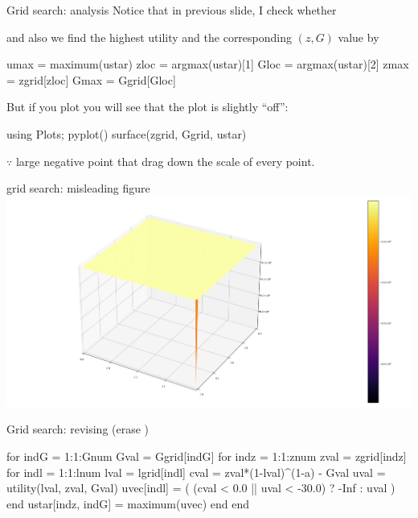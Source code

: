 \documentclass[11pt,aspectratio=43,usenames,dvipsnames]{beamer}
\theoremstyle{definition}
\begin{document}
\begin{frame}[fragile]{Grid search: analysis}
\label{slide:Grid_search__analysis}
Notice that in previous slide, I check whether 

and also we find the highest utility and the corresponding $ (z, G) $ value by
\begin{juliacode}
    umax = maximum(ustar)
    zloc = argmax(ustar)[1]
    Gloc = argmax(ustar)[2]
    zmax = zgrid[zloc]
    Gmax = Ggrid[Gloc]
\end{juliacode}

But if you plot you will see that the plot is slightly ``off'':
\begin{juliacode}
    using Plots; pyplot()
    surface(zgrid, Ggrid, ustar)
\end{juliacode}

$ \because $ large negative point that drag down the scale of every point.

\end{frame}

\begin{frame}{grid search: misleading figure}
\label{slide:grid_search__misleading_figure}
    \includegraphics[width=\textwidth]{./figures/utilitygov_wrong.png}
\end{frame}

\begin{frame}[fragile]{Grid search: revising (erase )}
\label{slide:Grid_search__structure__cont__}
\begin{juliacode}
    for indG = 1:1:Gnum
        Gval = Ggrid[indG]
        for indz = 1:1:znum
            zval = zgrid[indz]
            for indl = 1:1:lnum
                lval = lgrid[indl]
                cval = zval*(1-lval)^(1-a) - Gval
                uval = utility(lval, zval, Gval)
                uvec[indl] = ( (cval < 0.0 || uval < -30.0)
                                ? -Inf : uval )
            end
            ustar[indz, indG] = maximum(uvec)
        end
    end
\end{juliacode}

\end{frame}
\end{document}

